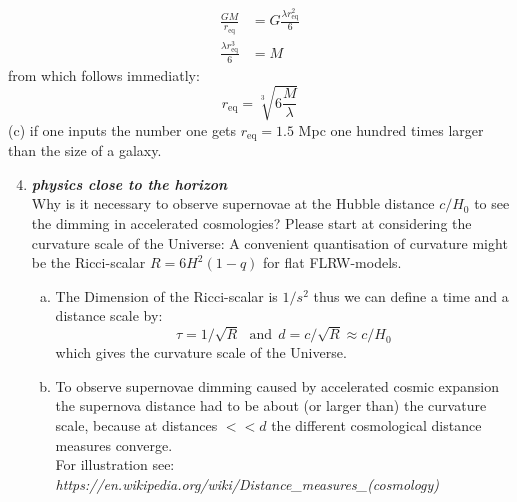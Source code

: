 \documentclass[a4paper,12pt]{article}
\newcommand{\question}[1]{\textbf{\textit{#1}}}
\begin{document}
		\begin{align}
		  \frac{GM}{r_\textrm{eq}}&=G\frac{\lambda r_\textrm{eq}^2}{6}\\
		  \frac{\lambda r_\textrm{eq}^3}{6}&=M
		\end{align}
		from which follows immediatly:
		\begin{equation}
		  r_\textrm{eq}=\sqrt[3]{6\frac{M}{\lambda}}
		\end{equation}
		(c) if one inputs the number one gets $ r_\textrm{eq}
                =1.5$ Mpc one hundred times larger than the size of a galaxy.
        \begin{enumerate}
        \setcounter{enumi}{3}
		\item \question{physics close to the horizon}\\
		Why is it necessary to observe supernovae at the Hubble distance $c/H_0$ to see the dimming in accelerated cosmologies? Please start at considering the curvature scale of the Universe: A convenient quantisation of curvature might be the Ricci-scalar $R = 6H^2(1-q)$ for flat FLRW-models.
		\begin{enumerate}[(a)]
			\item The Dimension of the Ricci-scalar is $1/s^2$ thus we can define a time and a distance scale by:
			$$ \tau = 1/\sqrt{R} \ \ \ \mathrm{and} \ \ d = c/\sqrt{R} \approx c/H_0$$
			which gives the curvature scale of the Universe. 
			\item To observe supernovae dimming caused by accelerated cosmic expansion the supernova distance had to be about (or larger than) the curvature scale, because at distances $<<d$ the different cosmological distance measures converge. \\
			For illustration see: \textit{https://en.wikipedia.org/wiki/Distance\_measures\_(cosmology)}
		\end{enumerate}
		

\end{enumerate}
\end{document}
